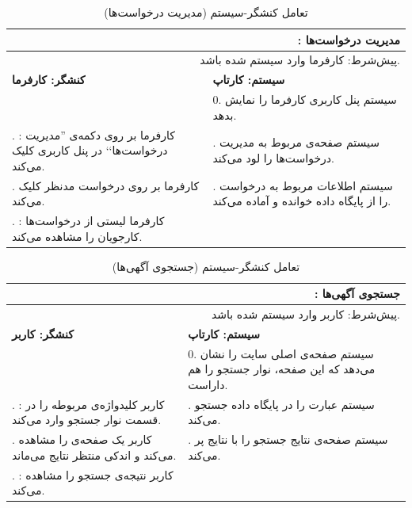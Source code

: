 \documentclass[12pt,svgnames,oneside]{book}
\newcommand{\say}[1]{‍''{#1}`‍`}
\newcommand{\uc}[1]{\lr{UC{#1}}}
\newcommand{\tucbw}{\lr{TUCBW}}
\newcommand{\tucew}{\lr{TUCEW}}
\newcommand{\actorsystem}[1]{
\textbf{کنشگر: {#1}} &
\textbf{سیستم: کارتاپ} \\
}
\newcommand{\zerostep}[1]{
& 0. {#1} \\
}
\newcounter{UseCaseCounter}
\newcommand{\step}[1]{
\stepcounter{UseCaseCounter}\arabic{UseCaseCounter}. {#1}
}
\newcommand{\ucname}[2]{
\multicolumn{2}{|r|}{\uc{{#1}}: {#2}} \\
}
\newcommand{\preif}[1]{
\multicolumn{2}{|r|}{پیش‌شرط:‌ {#1}} \\
}
\begin{document}
\begin{table}[H]
\caption{تعامل کنشگر-سیستم  (مدیریت درخواست‌ها)}
\label{table:uc:req-manage}
\begin{center}
\begin{tabular}{|p{}|p{}|}
\hline

\ucname{22}{مدیریت درخواست‌ها}
\hline

\preif{کارفرما وارد سیستم شده باشد.}
\hline

\actorsystem{کارفرما}
\hline

\zerostep{{\small سیستم پنل کاربری کارفرما را نمایش بدهد.}}
\hline

\step{{\small \textbf{\tucbw}: کارفرما بر روی دکمه‌ی \say{مدیریت درخواست‌ها} در پنل کاربری کلیک می‌کند.}} & 
\step{{\small سیستم صفحه‌ی مربوط به مدیریت درخواست‌ها را لود می‌کند.}} \\
\hline

\step{{\small کارفرما بر روی درخواست مدنظر کلیک می‌کند.}} & 
\step{{\small سیستم اطلاعات مربوط به درخواست را از پایگاه‌ داده خوانده و آماده می‌‌کند.}} \\ \hline
\step{{\small \textbf{\tucew}: کارفرما لیستی از درخواست‌ها کارجویان را مشاهده می‌کند.}} & 
\\
\hline

\end{tabular}
\end{center}
\end{table}

\setcounter{UseCaseCounter}{0}
\begin{table}[H]
\caption{تعامل کنشگر-سیستم  (‌جستجوی آگهی‌ها)}
\label{table:uc:apply-search}
\begin{center}
\begin{tabular}{|p{}|p{}|}
\hline

\ucname{23}{جستجوی آگهی‌ها}
\hline

\preif{کاربر وارد سیستم شده باشد.}
\hline

\actorsystem{کاربر}
\hline

\zerostep{{\small سیستم صفحه‌‌ی اصلی سایت را نشان می‌دهد که این صفحه، نوار جستجو را هم داراست.}}
\hline

\step{{\small \textbf{\tucbw}: کاربر کلید‌واژه‌ی مربوطه را در قسمت نوار جستجو وارد می‌کند.}} & 
\step{{\small سیستم عبارت را در پایگاه داده جستجو می‌کند.}} \\
\hline

\step{{\small کاربر یک صفحه‌ی \lr{preload} را مشاهده می‌کند و اندکی منتظر نتایج می‌ماند.}} &
\step{{\small سیستم صفحه‌ی نتایج جستجو را با نتایج پر می‌کند.}} \\
\hline

\step{{\small \textbf{\tucew}: کاربر نتیجه‌ی جستجو را مشاهده می‌کند.}} & 
\\
\hline

\end{tabular}
\end{center}
\end{table}
\end{document}
